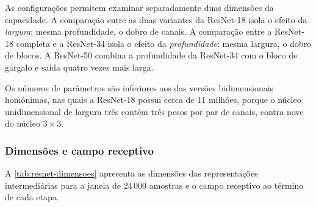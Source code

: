 \begin{table}[h!]
	\captionsetup{width=15.5cm}
\end{table}

As configurações permitem examinar separadamente duas dimensões da
capacidade. A comparação entre as duas variantes da ResNet-18 isola o efeito
da \textit{largura}: mesma profundidade, o dobro de canais. A comparação
entre a ResNet-18 completa e a ResNet-34 isola o efeito da
\textit{profundidade}: mesma largura, o dobro de blocos. A ResNet-50 combina
a profundidade da ResNet-34 com o bloco de gargalo e saída quatro vezes mais
larga.

Os números de parâmetros são inferiores aos das versões bidimensionais
homônimas, nas quais a ResNet-18 possui cerca de 11 milhões, porque o núcleo
unidimensional de largura três contém três pesos por par de canais, contra
nove do núcleo $3 \times 3$.

\subsubsection{Dimensões e campo receptivo}
\label{subsubsec:fund-resnet-dimensoes}

A \autoref{tab:resnet-dimensoes} apresenta as dimensões das representações
intermediárias para a janela de 24\,000 amostras e o campo receptivo ao
término de cada etapa.

